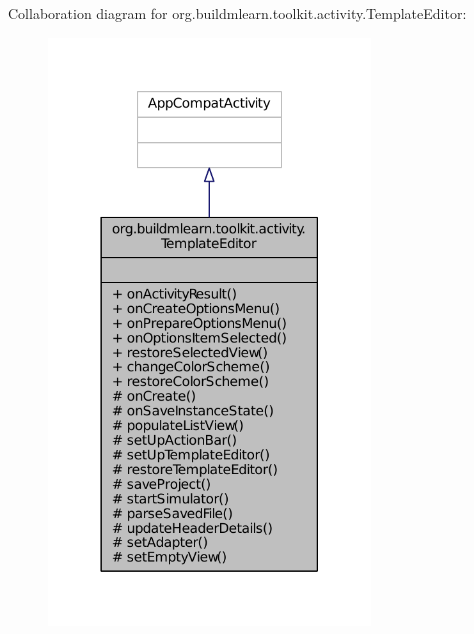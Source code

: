 Collaboration diagram for org.\-buildmlearn.\-toolkit.\-activity.\-Template\-Editor\-:
\nopagebreak
\begin{figure}[H]
\begin{center}
\leavevmode
\includegraphics[width=242pt]{d4/d61/classorg_1_1buildmlearn_1_1toolkit_1_1activity_1_1TemplateEditor__coll__graph}
\end{center}
\end{figure}
